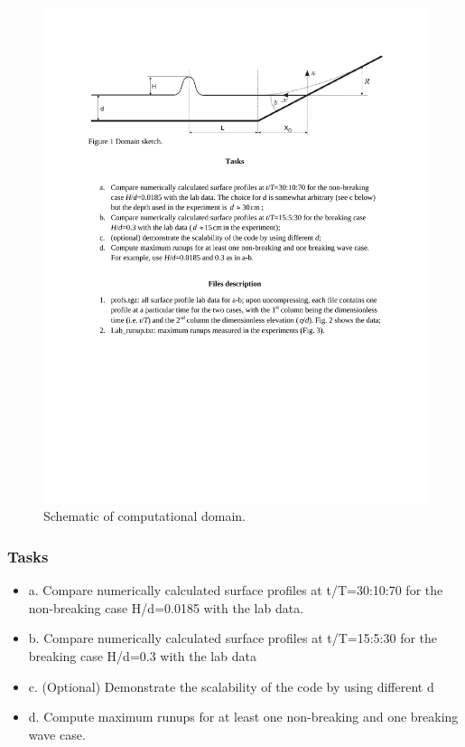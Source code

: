 \begin{figure}[ht]
\hfil\includegraphics[width=7.0in]{bp4/domainbp4.pdf}\hfil
\caption{\label{domainbp4}
Schematic of computational domain.
  }
\end{figure}

\subsubsection{Tasks}

\begin{itemize}
\item a. Compare numerically calculated surface profiles at t/T=30:10:70 for the non-breaking case H/d=0.0185 with the lab data.
\item b. Compare numerically calculated surface profiles at t/T=15:5:30 for the breaking case H/d=0.3 with the lab data
\item c. (Optional) Demonstrate the scalability of the code by using different d
\item d. Compute maximum runups for at least one non-breaking and one breaking wave case.
\end{itemize}

